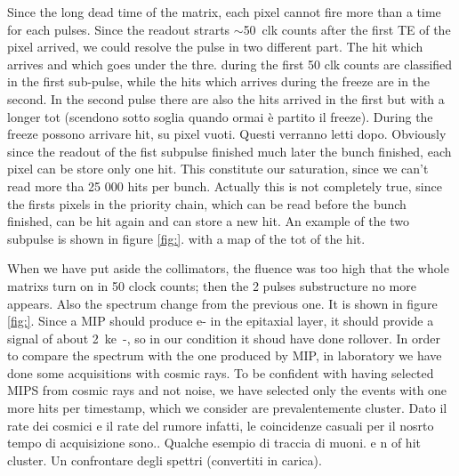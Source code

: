    Since the long dead time of the matrix, each pixel cannot fire more than a time for each pulses. 
   Since the readout strarts $\sim$\SI{50}{clk} counts after the first TE of the pixel arrived, we could resolve the pulse in two different part. 
   The hit which arrives and which goes under the thre. during the first 50 clk counts are classified in the first sub-pulse, while the hits which arrives during the freeze are in the second. In the second pulse there are also the hits arrived in the first but with a longer tot (scendono sotto soglia quando ormai è partito il freeze). 
   During the freeze possono arrivare hit, su pixel vuoti. Questi verranno letti dopo. 
   Obviously since the readout of the fist subpulse finished much later the bunch finished, each pixel can be store only one hit. 
   This constitute our saturation, since we can't read more tha 25 000 hits per bunch. 
   Actually this is not completely true, since the firsts pixels in the priority chain, which can be read before the bunch finished, can be hit again and can store a new hit. 
   An example of the two subpulse is shown in figure \ref{fig:}. with a map of the tot of the hit. 

   When we have put aside the collimators, the fluence was too high that the whole matrixs turn on in 50 clock counts; then the 2 pulses substructure no more appears. Also the spectrum change from the previous one. 
   It is shown in figure \ref{fig:}.
   Since a MIP should produce e- in the epitaxial layer, it should provide a signal of about \SI{2}{ke-}, so in our condition it shoud have done rollover. 
   In order to compare the spectrum with the one produced by MIP, in laboratory we have done some acquisitions with cosmic rays. 
   To be confident with having selected MIPS from cosmic rays and not noise, we have selected only the events with one more hits per timestamp, which we consider are prevalentemente cluster. Dato il rate dei cosmici e il rate del rumore infatti, le coincidenze casuali per il nosrto tempo di acquisizione sono.. Qualche esempio di traccia di muoni. e n of hit cluster. 
   Un confrontare degli spettri (convertiti in carica). 



